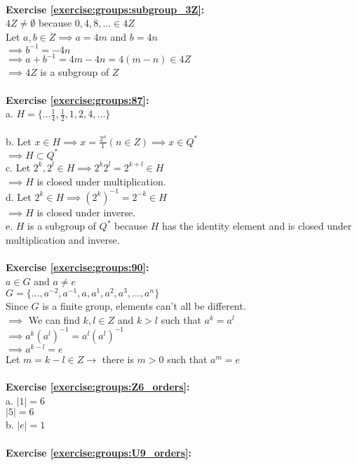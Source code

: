 \\
\textbf{Exercise \ref{exercise:groups:subgroup_3Z}:}\\
$4Z\neq\emptyset$ because $0,4,8,...\in 4Z$\\
Let $a,b\in Z\implies a=4m$ and $b=4n$\\
$\implies b^{-1}=-4n$\\
$\implies a+b^{-1}=4m-4n=4(m-n)\in 4Z$\\
$\implies 4Z$ is a subgroup of $Z$\\
\\
\textbf{Exercise \ref{exercise:groups:87}:}\\
a. $H=\{...\displaystyle\frac{1}{4},\frac{1}{2},1,2,4,...\}$\\
\\
b. Let $x\in H\implies x=\displaystyle\frac{2^n}{1}(n\in Z)\implies x\in Q^*$\\
$\implies H\subset Q^*$\\
c. Let $2^k,2^l\in H\implies 2^k2^l=2^{k+l}\in H$\\
$\implies H$ is closed under multiplication.\\
d. Let $2^k\in H\implies (2^k)^{-1}=2^{-k}\in H$\\
$\implies H$ is closed under inverse.\\
e. $H$ is a subgroup of $Q^*$ because $H$ has the identity element and is closed under multiplication and inverse.\\
\\
\textbf{Exercise \ref{exercise:groups:90}:}\\
$a\in G$ and $a\neq e$\\
$G=\{...,a^{-2},a^{-1},a,a^1,a^2,a^3,...,a^n\}$\\
Since $G$ is a finite group, elements can't all be different.\\
$\implies$  We can find $k,l\in Z$ and $k>l$ such that $a^k=a^l$\\
$\implies a^k(a^l)^{-1}=a^l(a^l)^{-1}$\\
$\implies a^{k-l}=e$\\
Let $m=k-l\in Z\to$ there is $m>0$ such that $a^m=e$\\
\\
\textbf{Exercise \ref{exercise:groups:Z6_orders}:}\\
a. $|1|=6$\\
$|5|=6$\\
b. $|e|=1$\\
\\
\textbf{Exercise \ref{exercise:groups:U9_orders}:}\\
